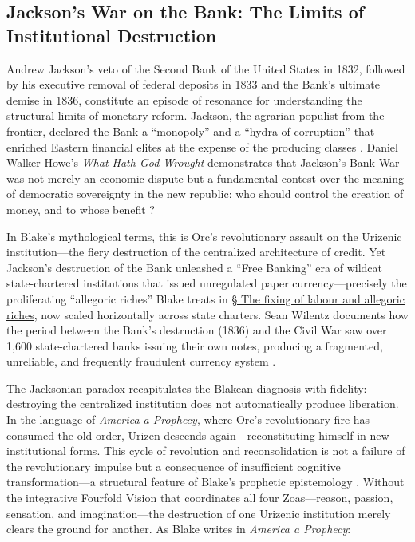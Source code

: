 \documentclass[
]{article}
\begin{document}
\subsection{Jackson's War on the Bank: The Limits of Institutional
Destruction}\label{jacksons-war-on-the-bank-the-limits-of-institutional-destruction}

Andrew Jackson's veto of the Second Bank of the United States in 1832,
followed by his executive removal of federal deposits in 1833 and the
Bank's ultimate demise in 1836, constitute an episode of resonance for
understanding the structural limits of monetary reform. Jackson, the
agrarian populist from the frontier, declared the Bank a ``monopoly''
and a ``hydra of corruption'' that enriched Eastern financial elites at
the expense of the producing classes
\citep{howe2007what, wilentz2005rise}. Daniel Walker Howe's \emph{What
Hath God Wrought} demonstrates that Jackson's Bank War was not merely an
economic dispute but a fundamental contest over the meaning of
democratic sovereignty in the new republic: who should control the
creation of money, and to whose benefit \citep{howe2007what}?

In Blake's mythological terms, this is Orc's revolutionary assault on
the Urizenic institution---the fiery destruction of the centralized
architecture of credit. Yet Jackson's destruction of the Bank unleashed
a ``Free Banking'' era of wildcat state-chartered institutions that
issued unregulated paper currency---precisely the proliferating
``allegoric riches'' Blake treats in \hyperref[sec-allegoric-riches]{§
The fixing of labour and allegoric riches}, now scaled horizontally
across state charters. Sean Wilentz documents how the period between the
Bank's destruction (1836) and the Civil War saw over 1,600
state-chartered banks issuing their own notes, producing a fragmented,
unreliable, and frequently fraudulent currency system
\citep{wilentz2005rise}.

The Jacksonian paradox recapitulates the Blakean diagnosis with
fidelity: destroying the centralized institution does not automatically
produce liberation. In the language of \emph{America a Prophecy}, where
Orc's revolutionary fire has consumed the old order, Urizen descends
again---reconstituting himself in new institutional forms. This cycle of
revolution and reconsolidation is not a failure of the revolutionary
impulse but a consequence of insufficient cognitive transformation---a
structural feature of Blake's prophetic epistemology
\citep{friedman2026blake, friedman2026doors}. Without the integrative
Fourfold Vision that coordinates all four Zoas---reason, passion,
sensation, and imagination---the destruction of one Urizenic institution
merely clears the ground for another. As Blake writes in \emph{America a
Prophecy}:
\end{document}
